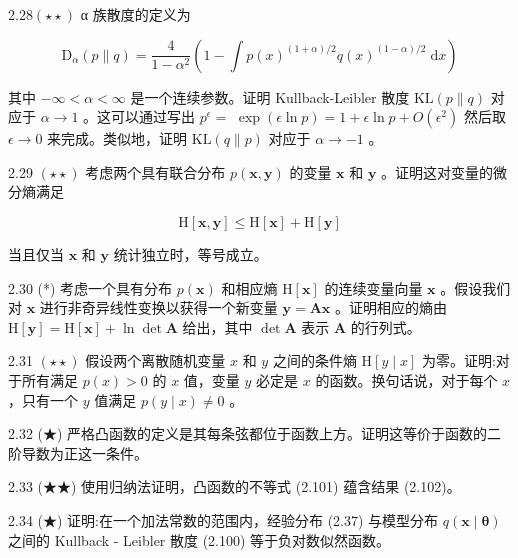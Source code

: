 \documentclass[10pt]{article}
\begin{document}
\({2.28}\left( {\star  \star  }\right)\) α 族散度的定义为

\[
{\mathrm{D}}_{\alpha }\left( {p\parallel q}\right)  = \frac{4}{1 - {\alpha }^{2}}\left( {1-\int p{\left( x\right) }^{\left( {1 + \alpha }\right) /2}q{\left( x\right) }^{\left( {1 - \alpha }\right) /2}\mathrm{\;d}x}\right)  \tag{2.129}
\]

其中 \(- \infty  < \alpha  < \infty\) 是一个连续参数。证明 Kullback-Leibler 散度 \(\mathrm{{KL}}\left( {p\parallel q}\right)\) 对应于 \(\alpha  \rightarrow  1\) 。这可以通过写出 \({p}^{\epsilon } =\)  \(\exp \left( {\epsilon \ln p}\right)  = 1 + \epsilon \ln p + O\left( {\epsilon }^{2}\right)\) 然后取 \(\epsilon  \rightarrow  0\) 来完成。类似地，证明 \(\mathrm{{KL}}\left( {q\parallel p}\right)\) 对应于 \(\alpha  \rightarrow   - 1\) 。

2.29 \(\left( {\star  \star  }\right)\) 考虑两个具有联合分布 \(p\left( {\mathbf{x},\mathbf{y}}\right)\) 的变量 \(\mathbf{x}\) 和 \(\mathbf{y}\) 。证明这对变量的微分熵满足

\[
\mathrm{H}\left\lbrack  {\mathbf{x},\mathbf{y}}\right\rbrack   \leq  \mathrm{H}\left\lbrack  \mathbf{x}\right\rbrack   + \mathrm{H}\left\lbrack  \mathbf{y}\right\rbrack   \tag{2.130}
\]

当且仅当 \(\mathbf{x}\) 和 \(\mathbf{y}\) 统计独立时，等号成立。

2.30 (*) 考虑一个具有分布 \(p\left( \mathbf{x}\right)\) 和相应熵 \(\mathrm{H}\left\lbrack  \mathbf{x}\right\rbrack\) 的连续变量向量 \(\mathbf{x}\) 。假设我们对 \(\mathbf{x}\) 进行非奇异线性变换以获得一个新变量 \(\mathbf{y} = \mathbf{A}\mathbf{x}\) 。证明相应的熵由 \(\mathrm{H}\left\lbrack  \mathbf{y}\right\rbrack   = \mathrm{H}\left\lbrack  \mathbf{x}\right\rbrack   + \ln \det \mathbf{A}\) 给出，其中 \(\det \mathbf{A}\) 表示 \(\mathbf{A}\) 的行列式。

2.31 \(\left( {\star  \star  }\right)\) 假设两个离散随机变量 \(x\) 和 \(y\) 之间的条件熵 \(\mathrm{H}\left\lbrack  {y \mid  x}\right\rbrack\) 为零。证明:对于所有满足 \(p\left( x\right)  > 0\) 的 \(x\) 值，变量 \(y\) 必定是 \(x\) 的函数。换句话说，对于每个 \(x\) ，只有一个 \(y\) 值满足 \(p\left( {y \mid  x}\right)  \neq  0\) 。

2.32 (★) 严格凸函数的定义是其每条弦都位于函数上方。证明这等价于函数的二阶导数为正这一条件。

2.33 (★★) 使用归纳法证明，凸函数的不等式 (2.101) 蕴含结果 (2.102)。

2.34 (★) 证明:在一个加法常数的范围内，经验分布 (2.37) 与模型分布 \(q\left( {\mathbf{x} \mid  \mathbf{\theta }}\right)\) 之间的 Kullback - Leibler 散度 (2.100) 等于负对数似然函数。
\end{document}
